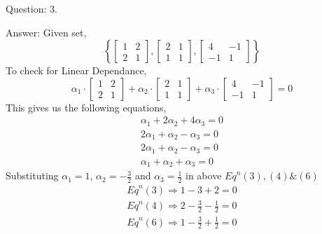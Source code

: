 \documentclass[a4paper]{article}
\begin{document}
\begin{qalist}
		\pagebreak	
		\item[Question: 3.] \setcounter{equation}{0} %
		\item[Answer:] Given set,
			\begin{equation}
				\left\{ \left[\begin{matrix}1 & 2 \\ 2 & 1\end{matrix}\right], 
					\left[\begin{matrix}2 & 1 \\ 1 & 1\end{matrix}\right], 
					\left[\begin{matrix}4 & -1 \\ -1 & 1\end{matrix}\right]
				\right\}
			\end{equation}
			To check for Linear Dependance,
			\begin{equation}
				{\alpha}_{1}\cdot\left[\begin{matrix}1 & 2 \\ 2 & 1\end{matrix}\right] + 
				{\alpha}_{2}\cdot\left[\begin{matrix}2 & 1 \\ 1 & 1\end{matrix}\right] + 
				{\alpha}_{3}\cdot\left[\begin{matrix}4 & -1 \\ -1 & 1\end{matrix}\right]
				 = 0
			\end{equation}
			This gives us the following equations,
			\begin{align}
				{\alpha}_{1} + 2{\alpha}_{2} + 4{\alpha}_{3} = 0 \\
				2{\alpha}_{1} + {\alpha}_{2} - {\alpha}_{3} = 0 \\
				2{\alpha}_{1} + {\alpha}_{2} - {\alpha}_{3} = 0 \\
				{\alpha}_{1} + {\alpha}_{2} + {\alpha}_{3} = 0
			\end{align}
			Substituting ${\alpha}_{1} = 1$, ${\alpha}_{2} = -\frac{3}{2}$ and ${\alpha}_{3} = \frac{1}{2}$ in above ${Eq}^{n} (3), (4) \& (6)$
			\begin{align}
				{Eq}^{n} (3) \Rightarrow 1 -3 + 2 = 0 \\
				{Eq}^{n} (4) \Rightarrow 2 - \frac{3}{2} - \frac{1}{2}= 0 \\
				{Eq}^{n} (6) \Rightarrow 1 - \frac{3}{2} + \frac{1}{2} = 0
			\end{align}
			

\end{qalist}
\end{document}
